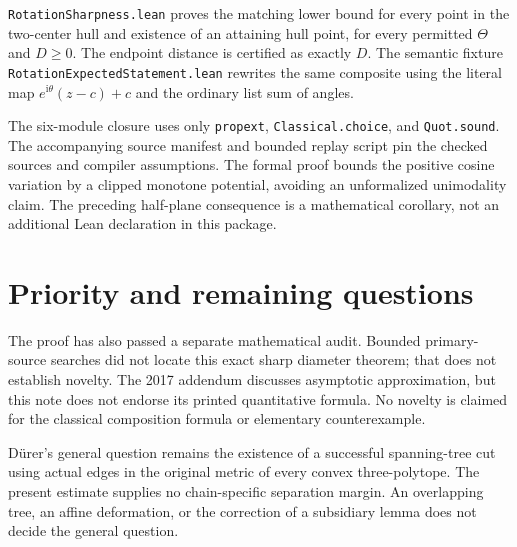 \documentclass[11pt,letterpaper]{article}
\newcommand{\ii}{\mathrm{i}}
\begin{document}
\texttt{RotationSharpness.lean} proves the matching lower bound for every
point in the two-center hull and existence of an attaining hull point, for
every permitted $\Theta$ and $D\ge0$. The endpoint distance is certified as
exactly $D$. The semantic fixture \texttt{RotationExpectedStatement.lean}
rewrites the same composite using the literal map
$e^{\ii\theta}(z-c)+c$ and the ordinary list sum of angles.

The six-module closure uses only \texttt{propext},
\texttt{Classical.choice}, and \texttt{Quot.sound}. The accompanying
source manifest and bounded replay script pin the checked sources and
compiler assumptions. The formal proof bounds the positive cosine variation
by a clipped monotone potential, avoiding an unformalized unimodality claim.
The preceding half-plane consequence is a mathematical corollary, not an
additional Lean declaration in this package.

\section{Priority and remaining questions}
The proof has also passed a separate mathematical audit. Bounded primary-source
searches did not locate this exact sharp diameter theorem; that does not
establish novelty. The 2017 addendum discusses asymptotic approximation, but
this note does not endorse its printed quantitative formula. No novelty is
claimed for the classical composition formula or elementary counterexample.

D\"urer's general question remains the existence of a successful spanning-tree
cut using actual edges in the original metric of every convex three-polytope.
The present estimate supplies no chain-specific separation margin. An
overlapping tree, an affine deformation, or the correction of a subsidiary
lemma does not decide the general question.
\end{document}

